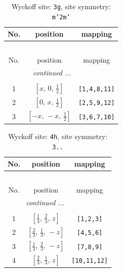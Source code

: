 \documentclass[fleqn,8pt]{jsarticle}
\begin{document}
\begin{longtable}{ccc}
\caption{Wyckoff site: {\tt 3g}, site symmetry: {\tt m'2m'}}
 \\
 \hline \hline
No. & position & mapping \\ \hline \endfirsthead

\multicolumn{2}{l}{\tablename\ \thetable{}} \\
 \hline \hline
No. & position & mapping \\ \hline \endhead

 \hline \hline
\multicolumn{2}{r}{\footnotesize\it continued ...} \\ \endfoot

 \hline \hline
\multicolumn{2}{r}{} \\ \endlastfoot

1 & $\left[ x,\, 0,\, \frac{1}{2} \right]$ & {\tt [1,4,8,11]} \\ \hline
2 & $\left[ 0,\, x,\, \frac{1}{2} \right]$ & {\tt [2,5,9,12]} \\ \hline
3 & $\left[ - x,\, - x,\, \frac{1}{2} \right]$ & {\tt [3,6,7,10]} \\
\end{longtable}
\renewcommand{\arraystretch}{1.2}
\begin{longtable}{ccc}
\caption{Wyckoff site: {\tt 4h}, site symmetry: {\tt 3..}}
 \\
 \hline \hline
No. & position & mapping \\ \hline \endfirsthead

\multicolumn{2}{l}{\tablename\ \thetable{}} \\
 \hline \hline
No. & position & mapping \\ \hline \endhead

 \hline \hline
\multicolumn{2}{r}{\footnotesize\it continued ...} \\ \endfoot

 \hline \hline
\multicolumn{2}{r}{} \\ \endlastfoot

1 & $\left[ \frac{1}{3},\, \frac{2}{3},\, z \right]$ & {\tt [1,2,3]} \\ \hline
2 & $\left[ \frac{2}{3},\, \frac{1}{3},\, - z \right]$ & {\tt [4,5,6]} \\ \hline
3 & $\left[ \frac{1}{3},\, \frac{2}{3},\, - z \right]$ & {\tt [7,8,9]} \\ \hline
4 & $\left[ \frac{2}{3},\, \frac{1}{3},\, z \right]$ & {\tt [10,11,12]} \\
\end{longtable}
\end{document}
